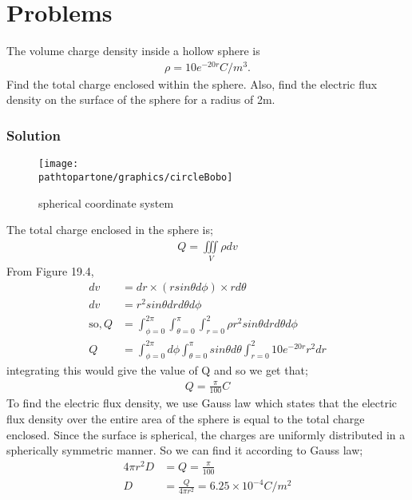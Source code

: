 \section{Problems}
\begin{exmp}
	The volume charge density inside a hollow sphere is 
	\begin{align*}
			\rho=10e^{-20r} C/m^{3}.
		\end{align*}
	Find the total charge enclosed within the sphere. Also, find the electric flux density on the surface of the sphere for a radius of 2m.
	
	\subsubsection*{Solution}
	\begin{figure}[h]
			\centering
			\texttt{[image: \\pathtopartone/graphics/circleBobo]}
			\caption{spherical coordinate system}
		\end{figure} 
	
	The total charge enclosed in the sphere is;
	\begin{align*}
			Q=\iiint\limits_V\rho dv
		\end{align*}
	From Figure 19.4, 
	\begin{align*}
			dv &= dr\times(rsin\theta d\phi)\times rd\theta \\
			dv&=r^{2}sin\theta drd\theta d\phi\\
			\text{so}, Q&=\int^{2\pi}_{\phi=0}\int^{\pi}_{\theta=0}\int^{2}_{r=0} \rho r^{2}sin\theta drd\theta d\phi\\
			Q&= \int^{2\pi}_{\phi=0}d\phi\int^{\pi}_{\theta=0}sin\theta d\theta\int^{2}_{r=0}10e^{-20r}r^{2}dr
		\end{align*}
	integrating this would give the value of Q and so we get that;
	\begin{align*}
			Q=\frac{\pi}{100} C
		\end{align*}
	To find the electric flux density, we use Gauss law which states that the electric flux density over the entire area of the sphere is equal to the total charge enclosed. Since the surface is spherical, the charges are uniformly distributed in a spherically symmetric manner. So we can find it according to Gauss law;
	\begin{align*}
			4\pi r^{2}D&=Q=\frac{\pi}{100}\\
			D&=\frac{Q}{4\pi r^{2}}= 6.25\times10^{-4} C/m^{2}
		\end{align*}
\end{exmp}

